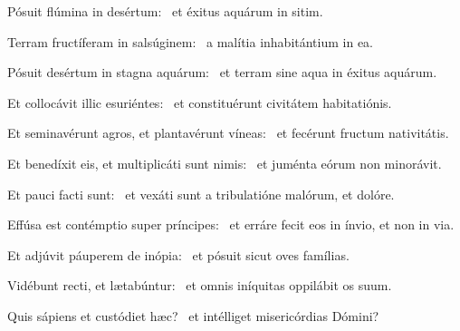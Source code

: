 \item Pósuit flúmina in desértum:~\psstar{} et éxitus aquárum in sitim.

\item Terram fructíferam in salsúginem:~\psstar{} a malítia inhabitántium in ea.

\item Pósuit desértum in stagna aquárum:~\psstar{} et terram sine aqua in éxitus aquárum.

\item Et collocávit illic esuriéntes:~\psstar{} et constituérunt civitátem habitatiónis.

\item Et seminavérunt agros, et plantavérunt víneas:~\psstar{} et fecérunt fructum nativitátis.

\item Et benedíxit eis, et multiplicáti sunt nimis:~\psstar{} et juménta eórum non minorávit.

\item Et pauci facti sunt:~\psstar{} et vexáti sunt a tribulatióne malórum, et dolóre.

\item Effúsa est contémptio super príncipes:~\psstar{} et erráre fecit eos in ínvio, et non in via.

\item Et adjúvit páuperem de inópia:~\psstar{} et pósuit sicut oves famílias.

\item Vidébunt recti, et lætabúntur:~\psstar{} et omnis iníquitas oppilábit os suum.

\item Quis sápiens et custódiet hæc?~\psstar{} et intélliget misericórdias Dómini?
